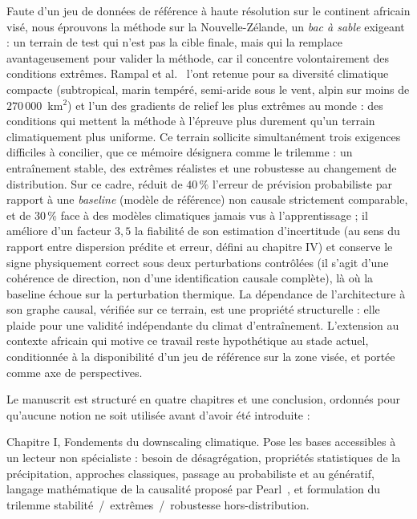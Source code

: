 Faute d'un jeu de données de référence à haute résolution sur le continent africain visé, nous éprouvons la méthode sur la Nouvelle-Zélande, un \emph{bac à sable} exigeant : un terrain de test qui n'est pas la cible finale, mais qui la remplace avantageusement pour valider la méthode, car il concentre volontairement des conditions extrêmes. Rampal et al.~\cite{rampal_cgan_2024} l'ont retenue pour sa diversité climatique compacte (subtropical, marin tempéré, semi-aride sous le vent, alpin sur moins de $270\,000$~km$^2$) et l'un des gradients de relief les plus extrêmes au monde : des conditions qui mettent la méthode à l'épreuve plus durement qu'un terrain climatiquement plus uniforme. Ce terrain sollicite simultanément trois exigences difficiles à concilier, que ce mémoire désignera comme le trilemme : un entraînement stable, des extrêmes réalistes et une robustesse au changement de distribution. Sur ce cadre, \Oracle{} réduit de $40\,\%$ l'erreur de prévision probabiliste par rapport à une \emph{baseline} (modèle de référence) non causale strictement comparable, et de $30\,\%$ face à des modèles climatiques jamais vus à l'apprentissage ; il améliore d'un facteur $3{,}5$ la fiabilité de son estimation d'incertitude (au sens du rapport entre dispersion prédite et erreur, défini au chapitre IV) et conserve le signe physiquement correct sous deux perturbations contrôlées (il s'agit d'une cohérence de direction, non d'une identification causale complète), là où la baseline échoue sur la perturbation thermique. La dépendance de l'architecture à son graphe causal, vérifiée sur ce terrain, est une propriété structurelle : elle plaide pour une validité indépendante du climat d'entraînement. L'extension au contexte africain qui motive ce travail reste hypothétique au stade actuel, conditionnée à la disponibilité d'un jeu de référence sur la zone visée, et portée comme axe de perspectives.

\label{intro:orga}

Le manuscrit est structuré en quatre chapitres et une conclusion, ordonnés pour qu'aucune notion ne soit utilisée avant d'avoir été introduite :

Chapitre I, Fondements du downscaling climatique. Pose les bases accessibles à un lecteur non spécialiste : besoin de désagrégation, propriétés statistiques de la précipitation, approches classiques, passage au probabiliste et au génératif, langage mathématique de la causalité proposé par Pearl~\cite{pearl_causality_2009}, et formulation du trilemme stabilité~/~extrêmes~/~robustesse hors-distribution.

